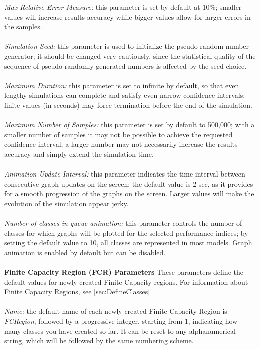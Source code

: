 \begin{description*}
\emph{Max Relative Error Measure:}
this parameter is set by default at 10\%; smaller values will increase results accuracy while bigger values allow for larger errors in the samples.\\\\
\emph{Simulation Seed:}
this parameter is used to initialize the pseudo-random number generator; it should be changed very cautiously, since the statistical quality of the sequence of pseudo-randomly generated numbers is affected by the seed choice.\\\\
\emph{Maximum Duration:}
this parameter is set to infinite by default, so that even lengthy simulations can complete and satisfy even narrow confidence intervals; finite values (in seconds) may force termination before the end of the simulation.\\\\
\emph{Maximum Number of Samples: }
this parameter is set by default to 500,000; with a smaller number of samples it may not be possible to achieve the requested confidence interval, a larger number may not necessarily increase the results accuracy and simply extend the simulation time.\\\\
\emph{Animation Update Interval:}
this parameter indicates the time interval between consecutive graph updates on the screen; the default value is 2 sec, as it provides for a smooth progression of the graphs on the screen. Larger values will make the evolution of the simulation appear jerky.\\\\
\emph{Number of classes in queue animation: }
this parameter controls the number of classes for which graphs will be plotted for the selected performance indices; by setting the default value to 10, all classes are represented in most models. Graph animation is enabled by default but can be disabled.\\\\
\textbf{Finite Capacity Region (FCR) Parameters}
These parameters define the default values for newly created Finite Capacity regions. For information about Finite Capacity Regions, see \autoref{sec:DefineClasses}\\\\
\emph{Name:}
the default name of each newly created Finite Capacity Region is \emph{FCRegion}, followed by a progressive integer, starting from 1, indicating how many classes you have created so far. It can be reset to any alphanumerical string, which will be followed by the same numbering scheme.\\\\

\end{description*}
